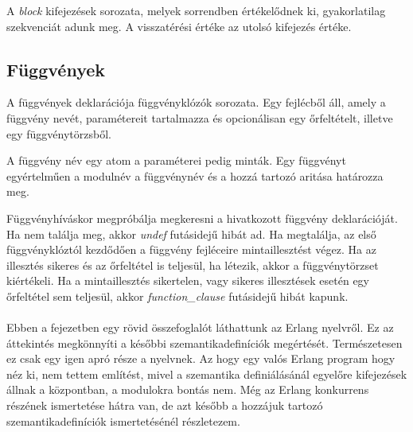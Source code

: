 

A \textit{block} kifejezések sorozata, melyek sorrendben értékelődnek ki, gyakorlatilag szekvenciát adunk meg. A visszatérési értéke az utolsó kifejezés értéke.

\subsection{Függvények}

A függvények deklarációja függvényklózók sorozata. Egy fejlécből áll, amely a függvény nevét, paramétereit tartalmazza és opcionálisan egy őrfeltételt, illetve egy függvénytörzsből.



A függvény név egy atom a paraméterei pedig minták. Egy függvényt egyértelműen a modulnév a függvénynév és a hozzá tartozó aritása határozza meg.

Függvényhíváskor megpróbálja megkeresni a hivatkozott függvény deklarációját. Ha nem találja meg, akkor \textit{undef} futásidejű hibát ad. Ha megtalálja, az első függvényklóztól kezdődően a függvény fejléceire mintaillesztést végez. Ha az illesztés sikeres és az őrfeltétel is teljesül, ha létezik, akkor a függvénytörzset kiértékeli. Ha a mintaillesztés sikertelen, vagy sikeres illesztések esetén egy őrfeltétel sem teljesül, akkor \textit{function\_clause} futásidejű hibát kapunk.

\paragraph{}
Ebben a fejezetben egy rövid összefoglalót láthattunk az Erlang nyelvről. Ez az áttekintés megkönnyíti a későbbi szemantikadefiníciók megértését. Természetesen ez csak egy igen apró része a nyelvnek. Az hogy egy valós Erlang program hogy néz ki, nem tettem említést, mivel a szemantika definiálásánál egyelőre kifejezések állnak a központban, a modulokra bontás nem. Még az Erlang konkurrens részének ismertetése hátra van, de azt később a hozzájuk tartozó szemantikadefiníciók ismertetésénél részletezem.